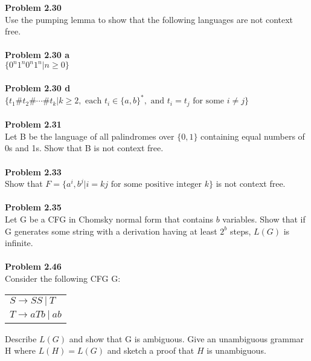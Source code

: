 \documentclass{article}
\newcommand{\enterProblemHeader}[1]{
    \nobreak\extramarks{}{Problem \arabic{#1} continued on next page\ldots}\nobreak{}
    \nobreak\extramarks{Problem \arabic{#1} (continued)}{Problem \arabic{#1} continued on next page\ldots}\nobreak{}
}
\newcommand{\exitProblemHeader}[1]{
    \nobreak\extramarks{Problem \arabic{#1} (continued)}{Problem \arabic{#1} continued on next page\ldots}\nobreak{}
    \stepcounter{#1}
    \nobreak\extramarks{Problem \arabic{#1}}{}\nobreak{}
}
\newcounter{partCounter}
\newcounter{homeworkProblemCounter}
\newenvironment{homeworkProblem}[1][-1]{
    \ifnum#1>0
        \setcounter{homeworkProblemCounter}{#1}
    \fi
    \section{Problem \arabic{homeworkProblemCounter}}
    \setcounter{partCounter}{1}
    \enterProblemHeader{homeworkProblemCounter}
}{
    \exitProblemHeader{homeworkProblemCounter}
}
\newcommand{\problem}[1]{\large{\textbf{Problem #1} \\}}
\begin{document}
\problem{2.30}
Use the pumping lemma to show that the following languages are not context free. \\ \\
\problem{2.30 a}
$\{ 0^n 1^n 0^n 1^n | n \geq 0  \}$ \\ \\
\problem{2.30 d}
$\{ t_1 \# t_2 \# \cdots \# t_k | k \geq 2,\text{ each } t_i \in \{a,b\}^*,\text{ and }t_i = t_j\text{ for some } i \neq j  \}$ \\ \\
\problem{2.31}
Let B be the language of all palindromes over $\{0,1\}$ containing equal numbers of 0s and 1s. Show that B is not context free. \\ \\
\problem{2.33}
Show that $F = \{a^i, b^j | i = kj\text{ for some positive integer } k\}$ is not context free. \\ \\
\problem{2.35}
Let G be a CFG in Chomsky normal form that contains $b$ variables. Show that if G generates some string with a derivation having 
at least $2^b$ steps, $L(G)$ is infinite. \\ \\
\problem{2.46}
Consider the following CFG G:
\begin{table}[h!]
\centering
\begin{tabular}{l}
$S \rightarrow SS \:| \:T$ \\
$T \rightarrow aTb \:| \:ab$
\end{tabular}
\end{table}
Describe $L(G)$ and show that G is ambiguous. Give an unambiguous grammar H where $L(H) = L(G)$ and
sketch a proof that $H$ is unambiguous.


\end{document}
